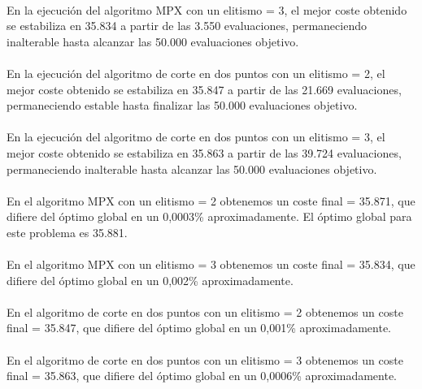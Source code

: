 	\paragraph{}En la ejecución del algoritmo MPX con un elitismo = 3, el mejor coste obtenido se estabiliza en 35.834 a partir de las 3.550 evaluaciones, permaneciendo inalterable hasta alcanzar las 50.000 evaluaciones objetivo.
	
	\paragraph{}En la ejecución del algoritmo de corte en dos puntos con un elitismo = 2, el mejor coste obtenido se estabiliza en 35.847 a partir de las 21.669 evaluaciones, permaneciendo estable hasta finalizar las 50.000 evaluaciones objetivo.
	
	\paragraph{}En la ejecución del algoritmo de corte en dos puntos con un elitismo = 3, el mejor coste obtenido se estabiliza en 35.863 a partir de las 39.724 evaluaciones, permaneciendo inalterable hasta alcanzar las 50.000 evaluaciones objetivo.
	
	\paragraph{}En el algoritmo MPX con un elitismo = 2 obtenemos un coste final = 35.871, que difiere del óptimo global en un 0,0003\% aproximadamente. El óptimo global para este problema es 35.881.
	
	\paragraph{}En el algoritmo MPX con un elitismo = 3 obtenemos un coste final = 35.834, que difiere del óptimo global en un 0,002\% aproximadamente.
	
	\paragraph{}En el algoritmo de corte en dos puntos con un elitismo = 2 obtenemos un coste final = 35.847, que difiere del óptimo global en un 0,001\% aproximadamente.
	
	\paragraph{}En el algoritmo de corte en dos puntos con un elitismo = 3 obtenemos un coste final = 35.863, que difiere del óptimo global en un 0,0006\% aproximadamente.

